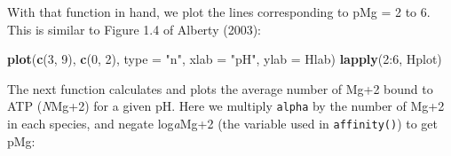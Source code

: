 \documentclass[]{tufte-book}
\newenvironment{Shaded}{}{}
\newcommand{\KeywordTok}[1]{\textcolor[rgb]{0.00,0.44,0.13}{\textbf{#1}}}
\newcommand{\DataTypeTok}[1]{\textcolor[rgb]{0.56,0.13,0.00}{#1}}
\newcommand{\DecValTok}[1]{\textcolor[rgb]{0.25,0.63,0.44}{#1}}
\newcommand{\FloatTok}[1]{\textcolor[rgb]{0.25,0.63,0.44}{#1}}
\newcommand{\StringTok}[1]{\textcolor[rgb]{0.25,0.44,0.63}{#1}}
\newcommand{\OtherTok}[1]{\textcolor[rgb]{0.00,0.44,0.13}{#1}}
\newcommand{\ControlFlowTok}[1]{\textcolor[rgb]{0.00,0.44,0.13}{\textbf{#1}}}
\newcommand{\OperatorTok}[1]{\textcolor[rgb]{0.40,0.40,0.40}{#1}}
\newcommand{\NormalTok}[1]{#1}
\begin{document}
\begin{Shaded}
\end{Shaded}

With that function in hand, we plot the lines corresponding to pMg = 2
to 6. This is similar to Figure 1.4 of Alberty (2003):

\begin{Shaded}
\begin{Highlighting}[]
\KeywordTok{plot}\NormalTok{(}\KeywordTok{c}\NormalTok{(}\DecValTok{3}\NormalTok{, }\DecValTok{9}\NormalTok{), }\KeywordTok{c}\NormalTok{(}\DecValTok{0}\NormalTok{, }\DecValTok{2}\NormalTok{), }\DataTypeTok{type =} \StringTok{"n"}\NormalTok{, }\DataTypeTok{xlab =} \StringTok{"pH"}\NormalTok{, }\DataTypeTok{ylab =}\NormalTok{ Hlab)}
\KeywordTok{lapply}\NormalTok{(}\DecValTok{2}\OperatorTok{:}\DecValTok{6}\NormalTok{, Hplot)}
\end{Highlighting}
\end{Shaded}

The next function calculates and plots the average number of Mg+2 bound
to ATP (\emph{N}Mg+2) for a given pH. Here we multiply \texttt{alpha} by
the number of Mg+2 in each species, and negate log\emph{a}Mg+2 (the
variable used in {\texttt{affinity()}}) to get pMg:
\end{document}
